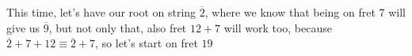 \documentclass[preview]{standalone}
\begin{document}
\begin{center}
This time, let's have our root on string $\overline{2}$, where we know that being on fret 7 will give us $\overline{9}$, but not only that, also fret $12 + 7$ will work too, because $\overline{2} + 7 + 12 \equiv \overline{2} + 7$, so let's start on fret $19$
\end{center}
\end{document}
